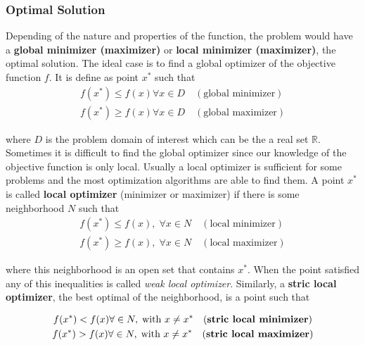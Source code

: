 \subsubsection{Optimal Solution} %

Depending of the nature and properties of the function, the problem would have a \textbf{global minimizer (maximizer)} or \textbf{local minimizer (maximizer)}, the optimal solution. The ideal case is to find a global optimizer of the objective function $f$. It is define as point $x^*$ such that 
\begin{gather*}
    f(x^*) \leq f(x)  \forall x \in D \quad (\text{global minimizer})\\
    f(x^*) \geq f(x) \forall x \in D \quad(\text{global maximizer})
\end{gather*}

where $D$ is the problem domain of interest which can be the a real set $\mathbb{R}$. Sometimes it is difficult to find the global optimizer since our knowledge of the objective function is only local. Usually a local optimizer is sufficient for some problems and the most optimization algorithms are able to find them. A point $x^*$ is called \textbf{local optimizer} (minimizer or maximizer) if there is some neighborhood $N$ such that
\begin{gather*}
    f(x^*) \leq f(x), \; \forall x \in N\quad (\text{local minimizer})\\
    f(x^*) \geq f(x), \; \forall x \in N \quad(\text{local maximizer})
\end{gather*}

where this neighborhood is an open set that contains $x^*$. When the point satisfied any of this inequalities is called \textit{weak local optimizer}. Similarly, a \textbf{stric local optimizer}, the best optimal of the neighborhood, is a point such that

\begin{gather*}
    f(x^*)< f(x) \forall \in N, \; \text{with } x \neq x^* \quad \text{(\textbf{stric local minimizer})}\\
    f(x^*)> f(x) \forall \in N, \; \text{with } x \neq x^* \quad \text{(\textbf{stric local maximizer})}
\end{gather*}

